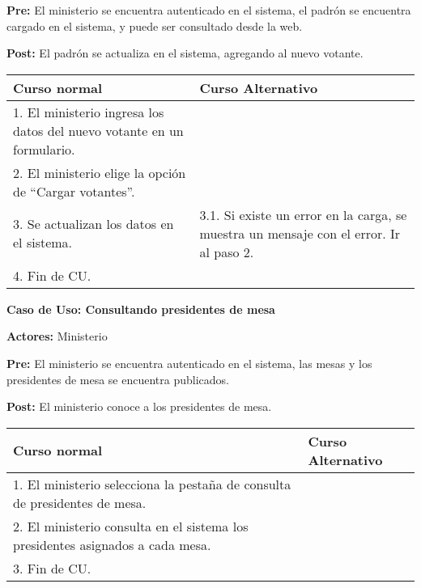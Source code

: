 \textbf{Pre:} El ministerio se encuentra autenticado en el sistema, el padrón se encuentra cargado en el sistema, y puede ser consultado desde la web.

\textbf{Post:} El padrón se actualiza en el sistema, agregando al nuevo votante.
\begin{table}[h!]
	
 \begin{tabular}{|p{7.5cm} | p{7.5cm}|} 
 \hline
 \textbf{Curso normal} & \textbf{Curso Alternativo} \\
 \hline

1. El ministerio ingresa los datos del nuevo votante en un formulario. & \\
\hline

2. El ministerio elige la opción de “Cargar votantes”. & \\
\hline

3. Se actualizan los datos en el sistema. & 3.1. Si existe un error en la carga, se muestra un mensaje con el error. Ir al paso 2. \\
\hline
4. Fin de CU. & \\
 \hline
 \end{tabular}

\end{table}


\textbf{Caso de Uso: Consultando presidentes de mesa}

\textbf{Actores:} Ministerio 

\textbf{Pre:} El ministerio se encuentra autenticado en el sistema, las mesas y los presidentes de mesa se encuentra publicados.

\textbf{Post:} El ministerio conoce a los presidentes de mesa.
\begin{table}[h!]
	
 \begin{tabular}{|p{7.5cm} | p{7.5cm}|} 
 \hline
 \textbf{Curso normal} & \textbf{Curso Alternativo} \\
 \hline

1. El ministerio selecciona la pestaña de consulta de presidentes de mesa. & \\
\hline
2. El ministerio consulta en el sistema los presidentes asignados a cada mesa. & \\
\hline
3. Fin de CU. & \\
\hline
 \end{tabular}

\end{table}

